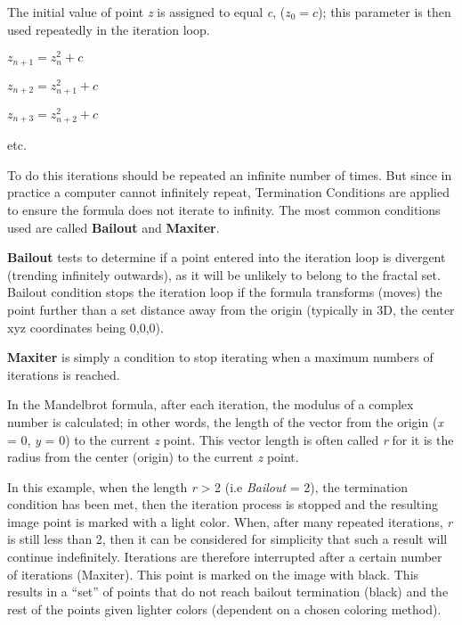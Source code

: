 The initial value of point \emph{z} is assigned to equal \emph{c}, ($ z_{0} = c
$); this parameter is then used repeatedly in the iteration loop.

\begin{center}
	\(z_{n + 1} = z_{n}^{2} + c\)
	
	\(z_{n + 2} = z_{n + 1}^{2} + c\)
	
	\(z_{n + 3} = z_{n + 2}^{2} + c\)
	
	etc.
\end{center}

To do this iterations should be repeated an infinite number of times. But since in practice a computer cannot
infinitely repeat, Termination Conditions are applied to ensure the formula does not iterate to
infinity. The most common conditions used are called \textbf{Bailout} and
\textbf{Maxiter}.

\label{bailout-maxiter}\textbf{Bailout} tests to determine if a point entered into the iteration loop is divergent (trending infinitely outwards), as it will be unlikely to belong to the fractal set. Bailout condition stops the iteration loop if the formula
transforms (moves) the point further than a set distance away from the
origin (typically in 3D, the center xyz coordinates being 0,0,0).

\textbf{Maxiter} is simply a condition to stop iterating when a maximum numbers
of iterations is reached. 

In the Mandelbrot formula, after each iteration, the modulus of a complex number
is calculated; in other words, the length of the vector from the origin
(\emph{x} = 0, \emph{y} = 0) to the current \emph{z} point. This vector length
is often called \emph{r} for it is the radius from the center (origin) to the
current \emph{z} point.

In this example, when the length \emph{r} \textgreater{} 2 (i.e \emph{Bailout} =
2), the termination condition has been met, then the iteration process is
stopped and the resulting image point is marked with a light color. When, after
many repeated iterations, \emph{r} is still less than 2, then it can be
considered for simplicity that such a result will continue indefinitely.
Iterations are therefore interrupted after a certain number of iterations
(Maxiter). This point is marked on the image with black. This results in a
``set'' of points that do not reach bailout termination (black) and the rest of
the points given lighter colors (dependent on a chosen coloring method).

